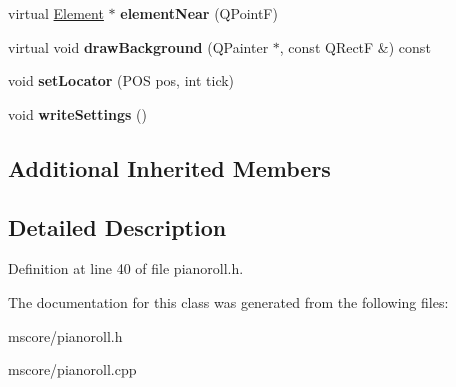\begin{DoxyCompactItemize}
virtual \hyperlink{class_ms_1_1_element}{Element} $\ast$ {\bfseries element\+Near} (Q\+PointF)
\item 
\mbox{\label{class_ms_1_1_pianoroll_editor_aef242a3a76bccae6604752853cbcdb3b}} 
virtual void {\bfseries draw\+Background} (Q\+Painter $\ast$, const Q\+RectF \&) const
\item 
\mbox{\label{class_ms_1_1_pianoroll_editor_a56cbecd96925b4e42843cbc7e48410d6}} 
void {\bfseries set\+Locator} (P\+OS pos, int tick)
\item 
\mbox{\label{class_ms_1_1_pianoroll_editor_a001957894382d9842ff20a87a75617dd}} 
void {\bfseries write\+Settings} ()
\end{DoxyCompactItemize}
\subsection*{Additional Inherited Members}


\subsection{Detailed Description}


Definition at line 40 of file pianoroll.\+h.



The documentation for this class was generated from the following files\+:\begin{DoxyCompactItemize}
\item 
mscore/pianoroll.\+h\item 
mscore/pianoroll.\+cpp\end{DoxyCompactItemize}
